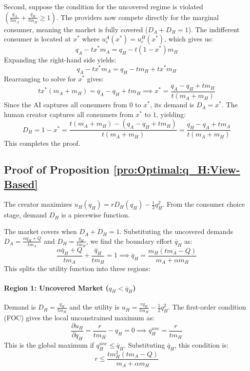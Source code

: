 Second, suppose the condition for the uncovered regime is violated $\left(\frac{q_A}{t m_A} + \frac{q_H}{t m_H} \ge 1\right)$. The providers now compete directly for the marginal consumer, meaning the market is fully covered ($D_A + D_H = 1$). The indifferent consumer is located at $x^*$ where $u_c^A(x^*) = u_c^H(x^*)$, which gives us:
\begin{equation*}
    q_A - t x^* m_A = q_H - t(1-x^*)m_H
\end{equation*}
Expanding the right-hand side yields:
\begin{equation*}
    q_A - t x^* m_A = q_H - t m_H + t x^* m_H
\end{equation*}
Rearranging to solve for $x^*$ gives:
\begin{equation*}
    t x^*(m_A + m_H) = q_A - q_H + t m_H \implies x^* = \frac{q_A - q_H + t m_H}{t(m_A + m_H)}
\end{equation*}
Since the AI captures all consumers from $0$ to $x^*$, its demand is $D_A = x^*$. The human creator captures all consumers from $x^*$ to $1$, yielding:
\begin{equation*}
    D_H = 1 - x^* = \frac{t(m_A + m_H) - (q_A - q_H + t m_H)}{t(m_A + m_H)} = \frac{q_H - q_A + t m_A}{t(m_A + m_H)}
\end{equation*}
This completes the proof.
\subsection*{Proof of Proposition \ref{pro:Optimal:q_H:View-Based}}
The creator maximizes $u_H(q_H) = r D_H(q_H) - \frac{1}{2}q_H^2$. From the consumer choice stage, demand $D_H$ is a piecewise function. 

The market covers when $D_A + D_H = 1$. Substituting the uncovered demands $D_A = \frac{\alpha q_H + Q}{t m_A}$ and $D_H = \frac{q_H}{t m_H}$, we find the boundary effort $\overline{q}_H$ as:
\begin{equation*}
    \frac{\alpha\overline{q}_H + Q}{t m_A} + \frac{\overline{q}_H}{t m_H} = 1 \implies \overline{q}_H = \frac{m_H(t m_A - Q)}{m_A + \alpha m_H}
\end{equation*}
This splits the utility function into three regions:

\paragraph{Region 1: Uncovered Market ($q_H < \overline{q}_H$)}
Demand is $D_H = \frac{q_H}{t m_H}$ and the utility is $u_H = \frac{r q_H}{t m_H} - \frac{1}{2}q_H^2$. The first-order condition (FOC) gives the local unconstrained maximum as:
\begin{equation*}
    \frac{\partial u_H}{\partial q_H} = \frac{r}{t m_H} - q_H = 0 \implies q_H^{unc} = \frac{r}{t m_H}
\end{equation*}
This is the global maximum if $q_H^{unc} \le \overline{q}_H$. Substituting $\overline{q}_H$, this condition is:
\begin{equation*}
    r \le \frac{t m_H^2 (t m_A - Q)}{m_A + \alpha m_H}
\end{equation*}

